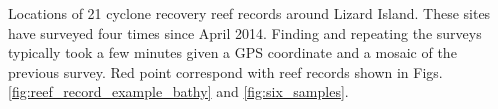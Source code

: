 \label{fig:sitemap} Locations of 21 cyclone recovery reef records around Lizard Island. These sites have surveyed four times since April 2014. Finding and repeating the surveys typically took a few minutes given a GPS coordinate and a mosaic of the previous survey. Red point correspond with reef records shown in Figs. \ref{fig:reef_record_example_bathy} and \ref{fig:six_samples}.
